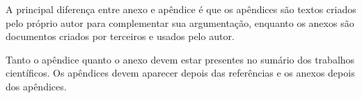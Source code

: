 \label{Cap:anexo}

A principal diferença entre anexo e apêndice é que os apêndices são textos criados pelo próprio autor para complementar sua argumentação, enquanto os anexos são documentos criados por terceiros e usados pelo autor.

Tanto o apêndice quanto o anexo devem estar presentes no sumário dos trabalhos científicos. Os apêndices devem aparecer depois das referências e os anexos depois dos apêndices.


